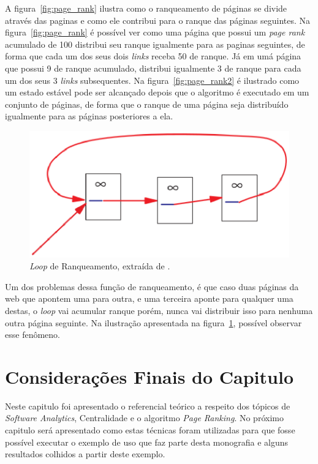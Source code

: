 A figura~\ref{fig:page_rank} ilustra como o ranqueamento de páginas se divide através das paginas e como ele contribui para o ranque das páginas seguintes. Na figura~\ref{fig:page_rank} é possível ver como uma página que possui um \textit{page rank} acumulado de 100 distribui seu ranque igualmente para as paginas seguintes, de forma que cada um dos seus dois \textit{links} receba 50 de ranque. Já em umá página que possui 9 de ranque acumulado, distribui igualmente 3 de ranque para cada um dos seus 3 \textit{links} subsequentes. Na figura~\ref{fig:page_rank2} é ilustrado como um estado estável pode ser alcançado depois que o algoritmo é executado em um conjunto de páginas, de forma que o ranque de uma página seja distribuído igualmente para as páginas posteriores a ela. 

\begin{figure}[!h]
    \centering
        \includegraphics[keepaspectratio=true,scale=0.5]{figuras/page_rank3.eps}
    \caption{\textit{Loop} de Ranqueamento, extraída de \cite{pageRank}.}
    \label{fig:page_rank3}
\end{figure}

Um dos problemas dessa função de ranqueamento, é que caso duas páginas da web que apontem uma para outra, e uma terceira aponte para qualquer uma destas, o \textit{loop} vai acumular ranque porém, nunca vai distribuir isso para nenhuma outra página seguinte. Na ilustração apresentada na figura~\ref{fig:page_rank3}, possível observar esse fenômeno.

\section{Considerações Finais do Capitulo}
Neste capitulo foi apresentado o referencial teórico a respeito dos tópicos de \textit{Software Analytics}, Centralidade e o algoritmo \textit{Page Ranking}. No próximo capitulo será apresentado como estas técnicas foram utilizadas para que fosse possível executar o exemplo de uso que faz parte desta monografia e alguns resultados colhidos a partir deste exemplo.

